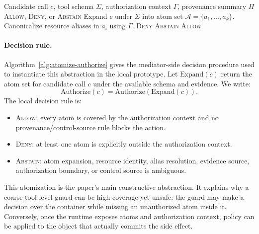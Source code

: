 \begin{algorithm}[t]
\caption{AtomizeAndAuthorize}
\label{alg:atomize-authorize}
\begin{algorithmic}[1]
\Require Candidate call $c$, tool schema $\Sigma$, authorization context $\Gamma$, provenance summary $\Pi$
\Ensure \textsc{Allow}, \textsc{Deny}, or \textsc{Abstain}
\State Expand $c$ under $\Sigma$ into atom set $\mathcal{A}=\{a_1,\ldots,a_k\}$.
  \State Canonicalize resource aliases in $a_i$ using $\Gamma$.
    \State \Return \textsc{Deny}
  \EndIf
    \State \Return \textsc{Abstain}
  \EndIf
\EndFor
\State \Return \textsc{Allow}
\end{algorithmic}
\end{algorithm}

\paragraph{Decision rule.}
Algorithm~\ref{alg:atomize-authorize} gives the mediator-side decision procedure used to instantiate this abstraction in the local prototype.
Let $\mathrm{Expand}(c)$ return the atom set for candidate call $c$ under the available schema and evidence. We write:
\[
  \mathrm{Authorize}(c) = \mathrm{Authorize}(\mathrm{Expand}(c)).
\]
The local decision rule is:
\begin{itemize}[leftmargin=*]
\item \textsc{Allow}: every atom is covered by the authorization context and no provenance/control-source rule blocks the action.
\item \textsc{Deny}: at least one atom is explicitly outside the authorization context.
\item \textsc{Abstain}: atom expansion, resource identity, alias resolution, evidence source, authorization boundary, or control source is ambiguous.
\end{itemize}

This atomization is the paper's main constructive abstraction. It explains why a coarse tool-level guard can be high coverage yet unsafe: the guard may make a decision over the container while missing an unauthorized atom inside it. Conversely, once the runtime exposes atoms and authorization context, policy can be applied to the object that actually commits the side effect.
